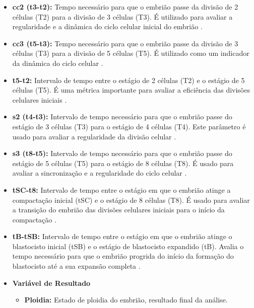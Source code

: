 \begin{apendicesenv}
\begin{itemize}
\begin{itemize}
    \item \textbf{cc2 (t3-t2):} Tempo necessário para que o embrião passe da divisão de 2 células (T2) para a divisão de 3 células (T3). É utilizado para avaliar a regularidade e a dinâmica do ciclo celular inicial do embrião \cite{ramalho2024}.
    \item \textbf{cc3 (t5-t3):} Tempo necessário para que o embrião passe da divisão de 3 células (T3) para a divisão de 5 células (T5). É utilizado como um indicador da dinâmica do ciclo celular \cite{ramalho2024}.
    \item \textbf{t5-t2:} Intervalo de tempo entre o estágio de 2 células (T2) e o estágio de 5 células (T5). É uma métrica importante para avaliar a eficiência das divisões celulares iniciais \cite{ramalho2024}.
    \item \textbf{s2 (t4-t3):} Intervalo de tempo necessário para que o embrião passe do estágio de 3 células (T3) para o estágio de 4 células (T4). Este parâmetro é usado para avaliar a regularidade da divisão celular \cite{ramalho2024}.
    \item \textbf{s3 (t8-t5):} Intervalo de tempo necessário para que o embrião passe do estágio de 5 células (T5) para o estágio de 8 células (T8). É usado para avaliar a sincronização e a regularidade do ciclo celular \cite{ramalho2024}.
    \item \textbf{tSC-t8:} Intervalo de tempo entre o estágio em que o embrião atinge a compactação inicial (tSC) e o estágio de 8 células (T8). É usado para avaliar a transição do embrião das divisões celulares iniciais para o início da compactação \cite{ramalho2024}.
    \item \textbf{tB-tSB:} Intervalo de tempo entre o estágio em que o embrião atinge o blastocisto inicial (tSB) e o estágio de blastocisto expandido (tB). Avalia o tempo necessário para que o embrião progrida do início da formação do blastocisto até a sua expansão completa \cite{ramalho2024}.
  \end{itemize}
\end{itemize}

\begin{itemize}
  \item \textbf{Variável de Resultado}
  \begin{itemize}
    \item \textbf{Ploidia:} Estado de ploidia do embrião, resultado final da análise.
  \end{itemize}
\end{itemize}



\end{apendicesenv}
